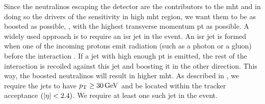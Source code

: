 Since the \glspl{neutralino} \neuto escaping the detector are the contributors to the \gls{mht} and in doing so the drivers of the sensitivity in high \gls{mht} region, we want them to be as boosted as possible, \ie, with the highest transverse momentum \gls{pt} as possible. A widely used approach is to require  an \gls{isr} jet in the event. An \gls{isr} jet is formed when one of the incoming protons emit radiation (such as a photon or a gluon) before the interaction . If a jet with high enough \gls{pt} is emitted, the rest of the interaction is recoiled against this jet and boosting it in the other direction. This way, the boosted \glspl{neutralino} \neuto will result in higher \gls{mht}. As described in , we require the jets to have $p_{\mathrm{T}} \geq 30\,\text{Ge\hspace{-.08em}V}$ and be located within the tracker acceptance $\left(\lvert \eta \rvert<2.4\right)$. We require at least one such jet in the event.
